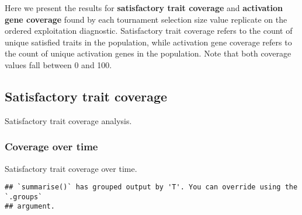\documentclass[]{book}
\newenvironment{Shaded}{\begin{snugshade}}{\end{snugshade}}
\newcommand{\DataTypeTok}[1]{\textcolor[rgb]{0.13,0.29,0.53}{#1}}
\newcommand{\KeywordTok}[1]{\textcolor[rgb]{0.13,0.29,0.53}{\textbf{#1}}}
\newcommand{\NormalTok}[1]{#1}
\newcommand{\OperatorTok}[1]{\textcolor[rgb]{0.81,0.36,0.00}{\textbf{#1}}}
\newcommand{\StringTok}[1]{\textcolor[rgb]{0.31,0.60,0.02}{#1}}
\begin{document}
Here we present the results for \textbf{satisfactory trait coverage} and \textbf{activation gene coverage} found by each tournament selection size value replicate on the ordered exploitation diagnostic.
Satisfactory trait coverage refers to the count of unique satisfied traits in the population, while activation gene coverage refers to the count of unique activation genes in the population.
Note that both coverage values fall between 0 and 100.

\hypertarget{satisfactory-trait-coverage-1}{%
\subsection{Satisfactory trait coverage}\label{satisfactory-trait-coverage-1}}

Satisfactory trait coverage analysis.

\hypertarget{coverage-over-time-5}{%
\subsubsection{Coverage over time}\label{coverage-over-time-5}}

Satisfactory trait coverage over time.

\begin{Shaded}
\end{Shaded}

\begin{verbatim}
## `summarise()` has grouped output by 'T'. You can override using the `.groups`
## argument.
\end{verbatim}
\end{document}
